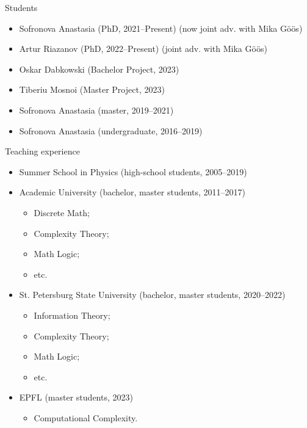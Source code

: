 \begin{frame}{Students}

    \begin{itemize}
        \item Sofronova Anastasia (PhD, 2021--Present) (now joint adv. with Mika G{\"{o}}{\"{o}}s)
        \item Artur Riazanov (PhD, 2022--Present) (joint adv. with Mika G{\"{o}}{\"{o}}s)
        \item Oskar Dabkowski (Bachelor Project, 2023)
        \item Tiberiu Mosnoi (Master Project, 2023)
        \item Sofronova Anastasia (master, 2019--2021)
        \item Sofronova Anastasia (undergraduate, 2016--2019)
    \end{itemize}
\end{frame}

\begin{frame}{Teaching experience}

    \begin{itemize}
        \item Summer School in Physics (high-school students, 2005--2019)
            \pause
        \item Academic University (bachelor, master students, 2011--2017)
            \begin{itemize}
                \item Discrete Math;
                \item Complexity Theory;
                \item Math Logic;
                \item etc.
            \end{itemize}
        \item St. Petersburg State University (bachelor, master students, 2020--2022)
            \begin{itemize}
                \item Information Theory;
                \item Complexity Theory;
                \item Math Logic;
                \item etc.
            \end{itemize}
        \item EPFL (master students, 2023)
            \begin{itemize}
                \item Computational Complexity.
            \end{itemize}
    \end{itemize}
\end{frame}